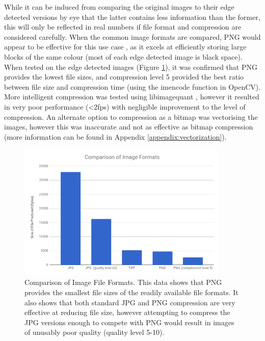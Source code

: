 While it can be induced from comparing the original images to their edge detected versions by eye that the latter contains less information than the former, this will only be reflected in real numbers if file format and compression are considered carefully. When the common image formats are compared, PNG would appear to be effective for this use case \cite{aguilera2006comparison}, as it excels at efficiently storing large blocks of the same colour (most of each edge detected image is black space). When tested on the edge detected images (Figure \ref{fig:compress}), it was confirmed that PNG provides the lowest file sizes, and compression level 5 provided the best ratio between file size and compression time (using the imencode function in OpenCV). More intelligent compression was tested using libimagequant \cite{libimagequant}, however it resulted in very poor performance (\textless2fps) with negligible improvement to the level of compression. An alternate option to compression as a bitmap was vectorising the images, however this was inaccurate and not as effective as bitmap compression (more information can be found in Appendix \ref{appendix:vectorization}).

\begin{figure}[H]
    \begin{center}
      \includegraphics[width=0.9\textwidth]{Figures/compression.png}
      \caption[Comparison of Image File Formats]{Comparison of Image File Formats. This data shows that PNG provides the smallest file sizes of the readily available file formats. It also shows that both standard JPG and PNG compression are very effective at reducing file size, however attempting to compress the JPG versions enough to compete with PNG would result in images of unusably poor quality (quality level 5-10).}
      \label{fig:compress}
    \end{center}
\end{figure}

